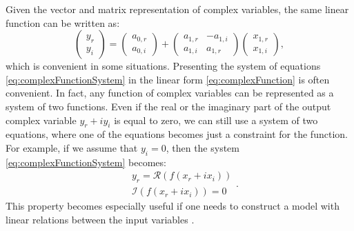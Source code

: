 \documentclass[
]{book}
\begin{document}
Given the vector and matrix representation of complex variables, the same linear function can be written as:
\begin{equation*}
    \begin{pmatrix} y_r \\ y_i \end{pmatrix} = \begin{pmatrix} a_{0,r} \\ a_{0,i} \end{pmatrix} + \begin{pmatrix} a_{1,r} & -a_{1,i} \\ a_{1,i} & a_{1,r} \end{pmatrix} \begin{pmatrix} x_{1,r} \\ x_{1,i} \end{pmatrix} ,
\end{equation*}
which is convenient in some situations. Presenting the system of equations \eqref{eq:complexFunctionSystem} in the linear form \eqref{eq:complexFunction} is often convenient. In fact, any function of complex variables can be represented as a system of two functions. Even if the real or the imaginary part of the output complex variable \(y_r + i y_i\) is equal to zero, we can still use a system of two equations, where one of the equations becomes just a constraint for the function. For example, if we assume that \(y_i=0\), then the system \eqref{eq:complexFunctionSystem} becomes:
\begin{equation*}
    \begin{aligned}
        & y_r = \mathcal{R}(f(x_r+ix_i)) \\
        & \mathcal{I}(f(x_r+ix_i)) = 0
    \end{aligned} .
\end{equation*}
This property becomes especially useful if one needs to construct a model with linear relations between the input variables \citep[this is discussed in Chapter ??? of][]{Svetunkov2014}.
\end{document}
